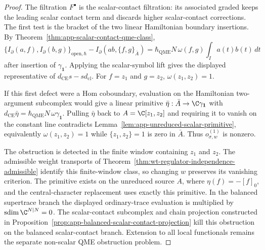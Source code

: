 \begin{proof}
  The filtration \(F^\bullet\) is the scalar-contact filtration:
  its associated graded keeps the leading scalar contact term and
  discards higher scalar-contact corrections.  The first test is the
  bracket of the two linear Hamiltonian boundary insertions.  By
  Theorem~\ref{thm:app-scalar-contact-qme-class},
  \[
    \{I_\partial(a,f),I_\partial(b,g)\}_{\mathrm{open},\hbar}
      -
    I_\partial(ab,\{f,g\}_{\bar A})
      =
    \hbar_{\mathrm{QME}}N\,\omega(f,g)\int_Ia(t)b(t)\,dt
  \]
  after insertion of \(\gamma_{\mathbf 1}\).  Applying the scalar-symbol
  lift gives the displayed representative of
  \(d_{\mathrm{CE}}s-sd_{\mathrm{cl}}\).  For \(f=z_1\) and \(g=z_2\),
  \(\omega(z_1,z_2)=1\).

  If this first defect were a Hom coboundary, evaluation on the
  Hamiltonian two-argument subcomplex would give a linear primitive
  \(\bar\eta:\bar A\to\C\gamma_{\mathbf 1}\) with
  \(d_{\mathrm{CE}}\bar\eta
    =\hbar_{\mathrm{QME}}N\,\omega\gamma_{\mathbf 1}\).  Pulling
  \(\bar\eta\) back to \(A=\C[z_1,z_2]\) and requiring it to vanish on the
  constant line contradicts
  Lemma~\ref{lem:app-unreduced-scalar-primitive}, equivalently
  \(\omega(z_1,z_2)=1\) while \(\{z_1,z_2\}=1\) is zero in \(\bar A\).
  Thus \(o_{\sigma,w}^{(1)}\) is nonzero.

  The obstruction is detected in the finite window containing \(z_1\) and
  \(z_2\).  The admissible weight transports of
  Theorem~\ref{thm:wt-regulator-independence-admissible} identify this
  finite-window class, so changing \(w\) preserves its vanishing criterion.
  The primitive exists on the unreduced source \(A\), where
  \(\eta(f)=-[f]_0\), and the central-character replacement uses exactly
  this primitive.  In the balanced supertrace branch the displayed
  ordinary-trace evaluation is multiplied by
  \(\operatorname{sdim}\C^{N|N}=0\).  The scalar-contact subcomplex and
  chain projection constructed in
  Proposition~\ref{prop:app-balanced-scalar-contact-projection} kill this
  obstruction on the balanced scalar-contact branch.  Extension to all
  local functionals remains the separate non-scalar QME obstruction
  problem.
\end{proof}

